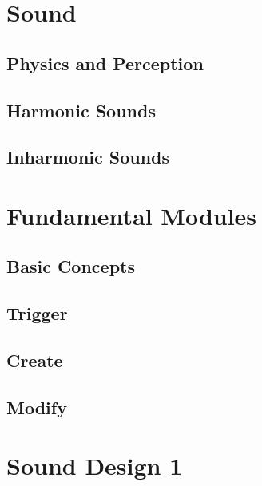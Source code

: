 \documentclass[
]{book}
\begin{document}
\hypertarget{part-sound}{%
\part{Sound}\label{part-sound}}

\hypertarget{physics-and-perception}{%
\chapter{Physics and Perception}\label{physics-and-perception}}

\hypertarget{harmonic-sounds}{%
\chapter{Harmonic Sounds}\label{harmonic-sounds}}

\hypertarget{inharmonic-sounds}{%
\chapter{Inharmonic Sounds}\label{inharmonic-sounds}}

\hypertarget{part-fundamental-modules}{%
\part{Fundamental Modules}\label{part-fundamental-modules}}

\hypertarget{basic-concepts}{%
\chapter{Basic Concepts}\label{basic-concepts}}

\hypertarget{trigger}{%
\chapter{Trigger}\label{trigger}}

\hypertarget{create}{%
\chapter{Create}\label{create}}

\hypertarget{modify}{%
\chapter{Modify}\label{modify}}

\hypertarget{part-sound-design-1}{%
\part{Sound Design 1}\label{part-sound-design-1}}
\end{document}
